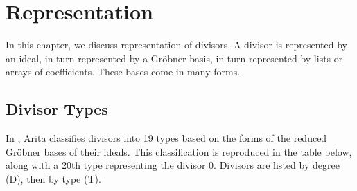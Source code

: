 
\section{Representation}
\label{chap_representation}

In this chapter, we discuss representation of divisors.
A divisor is represented by an ideal, in turn represented by a Gr\"obner basis,
in turn represented by lists or arrays of coefficients.
These bases come in many forms.



\subsection{Divisor Types}

In \cite{arita05-2}, Arita classifies divisors into 19 types
based on the forms of the reduced Gr\"obner bases of their ideals.
This classification is reproduced in the table below,
along with a 20th type representing the divisor 0.
Divisors are listed by degree (D), then by type (T).

